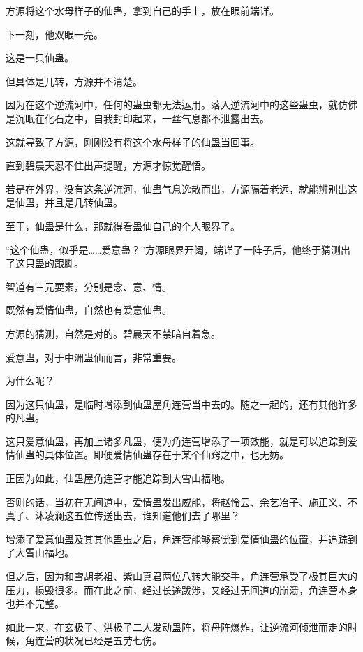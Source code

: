 
\begin{this_body}

方源将这个水母样子的仙蛊，拿到自己的手上，放在眼前端详。

下一刻，他双眼一亮。

这是一只仙蛊。

但具体是几转，方源并不清楚。

因为在这个逆流河中，任何的蛊虫都无法运用。落入逆流河中的这些蛊虫，就仿佛是沉眠在化石之中，自我封印起来，一丝气息都不泄露出去。

这就导致了方源，刚刚没有将这个水母样子的仙蛊当回事。

直到碧晨天忍不住出声提醒，方源才惊觉醒悟。

若是在外界，没有这条逆流河，仙蛊气息逸散而出，方源隔着老远，就能辨别出这是仙蛊，并且是几转仙蛊。

至于，仙蛊是什么，那就得看蛊仙自己的个人眼界了。

“这个仙蛊，似乎是……爱意蛊？”方源眼界开阔，端详了一阵子后，他终于猜测出了这只蛊的跟脚。

智道有三元要素，分别是念、意、情。

既然有爱情仙蛊，自然也有爱意仙蛊。

方源的猜测，自然是对的。碧晨天不禁暗自着急。

爱意蛊，对于中洲蛊仙而言，非常重要。

为什么呢？

因为这只仙蛊，是临时增添到仙蛊屋角连营当中去的。随之一起的，还有其他许多的凡蛊。

这只爱意仙蛊，再加上诸多凡蛊，便为角连营增添了一项效能，就是可以追踪到爱情仙蛊的具体位置。即便爱情仙蛊存在于某个仙窍之中，也无妨。

正因为如此，仙蛊屋角连营才能追踪到大雪山福地。

否则的话，当初在无间道中，爱情蛊发出威能，将赵怜云、余艺冶子、施正义、不真子、沐凌澜这五位传送出去，谁知道他们去了哪里？

增添了爱意仙蛊及其其他蛊虫之后，角连营能够察觉到爱情仙蛊的位置，并追踪到了大雪山福地。

但之后，因为和雪胡老祖、紫山真君两位八转大能交手，角连营承受了极其巨大的压力，损毁很多。而在此之前，经过长途跋涉，又经过无间道的崩溃，角连营本身也并不完整。

如此一来，在玄极子、洪极子二人发动蛊阵，将母阵爆炸，让逆流河倾泄而走的时候，角连营的状况已经是五劳七伤。


\end{this_body}
